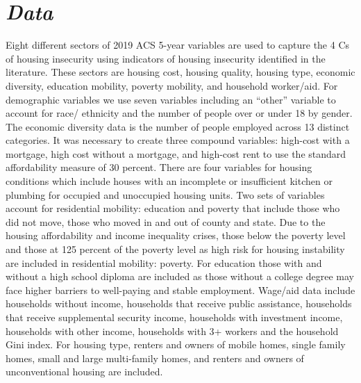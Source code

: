 \section{\textit{Data}}
Eight different sectors of 2019 ACS 5-year variables are used to capture the 4 Cs of housing insecurity using indicators of housing insecurity identified in the literature. These sectors are housing cost, housing quality, housing type, economic diversity, education mobility, poverty mobility, and household worker/aid. For demographic variables we use seven variables including an “other” variable to account for race/ ethnicity and the number of people over or under 18 by gender. The economic diversity data is the number of people employed across 13 distinct categories. It was necessary to create three compound variables: high-cost with a mortgage, high cost without a mortgage, and high-cost rent to use the standard affordability measure of 30 percent. There are four variables for housing conditions which include houses with an incomplete or insufficient kitchen or plumbing for occupied and unoccupied housing units. Two sets of variables account for residential mobility: education and poverty that include those who did not move, those who moved in and out of county and state.  Due to the housing affordability and income inequality crises, those below the poverty level and those at 125 percent of the poverty level as high risk for housing instability are included in residential mobility: poverty. For education those with and without a high school diploma are included as those without a college degree may face higher barriers to well-paying and stable employment. Wage/aid data include households without income, households that receive public assistance, households that receive supplemental security income, households with investment income, households with other income, households with 3+ workers and the household Gini index. For housing type, renters and owners of mobile homes, single family homes, small and large multi-family homes, and renters and owners of unconventional housing are included.  

